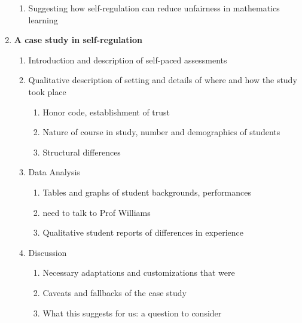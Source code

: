 \begin{enumerate}
\begin{enumerate}
      \item Suggesting how self-regulation can reduce unfairness in mathematics learning
    \end{enumerate}
    \item {\bf A case study in self-regulation}
    \begin{enumerate}
      \item Introduction and description of self-paced assessments
      \item Qualitative description of setting and details of where and how the study took place
      \begin{enumerate}
        \item Honor code, establishment of trust
        \item Nature of course in study, number and demographics of students
        \item Structural differences
      \end{enumerate}
      \item Data Analysis
      \begin{enumerate}
        \item Tables and graphs of student backgrounds, performances
        \item need to talk to Prof Williams
        \item Qualitative student reports of differences in experience
      \end{enumerate}
      \item Discussion
      \begin{enumerate}
        \item Necessary adaptations and customizations that were
        \item Caveats and fallbacks of the case study
        \item What this suggests for us: a question to consider
      \end{enumerate}
    \end{enumerate}
\end{enumerate}
